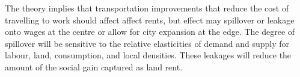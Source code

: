The theory implies that transportation improvements that reduce the cost of travelling to work should  affect affect rents, but effect may spillover or leakage  onto wages  at the centre or allow for city expansion at the edge.   
The degree of spillover will be sensitive to the relative elasticities of demand and supply  for labour, land, consumption, and local densities. These leakages will reduce the amount of the social gain captured as land rent. %


